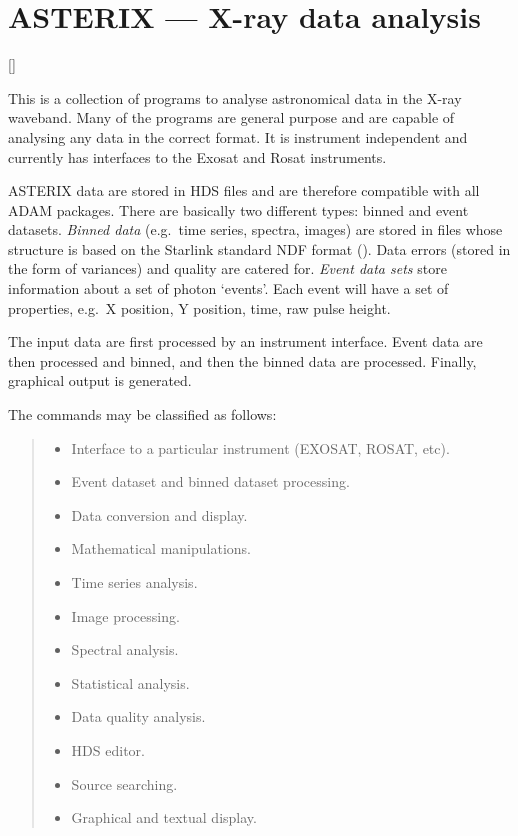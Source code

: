 \newpage

\section{ASTERIX --- X-ray data analysis} 

\vspace{-11mm}

\hfill []

\vspace{5mm}

This is a collection of programs to analyse astronomical data in the X-ray
waveband.
Many of the programs are general purpose and are capable of analysing any data
in the correct format.
It is instrument independent and currently has interfaces to the Exosat and
Rosat instruments. 

ASTERIX data are stored in HDS files and are therefore compatible with all ADAM
packages.
There are basically two different types: binned and event datasets.
{\em Binned data} (e.g.\ time series, spectra, images) are stored in files whose
structure is based on the Starlink standard NDF format
(). 
Data errors (stored in the form of variances) and quality are catered for.
{\em Event data sets} store information about a set of photon `events'.
Each event will have a set of properties, e.g.\ X position, Y position, time,
raw pulse height.

The input data are first processed by an instrument interface.
Event data are then processed and binned, and then the binned data are
processed.
Finally, graphical output is generated.

The commands may be classified as follows:
{\small
\begin{quote}
\begin{itemize}
\item Interface to a particular instrument (EXOSAT, ROSAT, etc).
\item Event dataset and binned dataset processing.
\item Data conversion and display.
\item Mathematical manipulations.
\item Time series analysis.
\item Image processing.
\item Spectral analysis.
\item Statistical analysis.
\item Data quality analysis.
\item HDS editor.
\item Source searching.
\item Graphical and textual display.
\end{itemize}
\end{quote}
}

